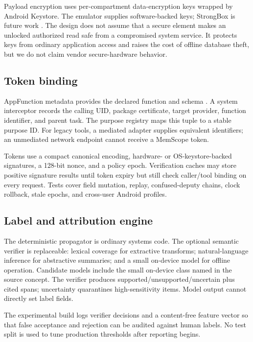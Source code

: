 Payload encryption uses per-compartment data-encryption keys wrapped by Android Keystore. The emulator supplies software-backed keys; StrongBox is future work \citep{android2026strongbox}. The design does not assume that a secure element makes an unlocked authorized read safe from a compromised system service. It protects keys from ordinary application access and raises the cost of offline database theft, but we do not claim vendor secure-hardware behavior.

\subsection{Token binding}

AppFunction metadata provides the declared function and schema \citep{android2026appfunctions}. A system interceptor records the calling UID, package certificate, target provider, function identifier, and parent task. The purpose registry maps this tuple to a stable purpose ID. For legacy tools, a mediated adapter supplies equivalent identifiers; an unmediated network endpoint cannot receive a MemScope token.

Tokens use a compact canonical encoding, hardware- or OS-keystore-backed signatures, a 128-bit nonce, and a policy epoch. Verification caches may store positive signature results until token expiry but still check caller/tool binding on every request. Tests cover field mutation, replay, confused-deputy chains, clock rollback, stale epochs, and cross-user Android profiles.

\subsection{Label and attribution engine}

The deterministic propagator is ordinary systems code. The optional semantic verifier is replaceable: lexical coverage for extractive transforms; natural-language inference for abstractive summaries; and a small on-device model for offline operation. Candidate models include the small on-device class named in the source concept. The verifier produces supported/unsupported/uncertain plus cited spans; uncertainty quarantines high-sensitivity items. Model output cannot directly set label fields.

The experimental build logs verifier decisions and a content-free feature vector so that false acceptance and rejection can be audited against human labels. No test split is used to tune production thresholds after reporting begins.

